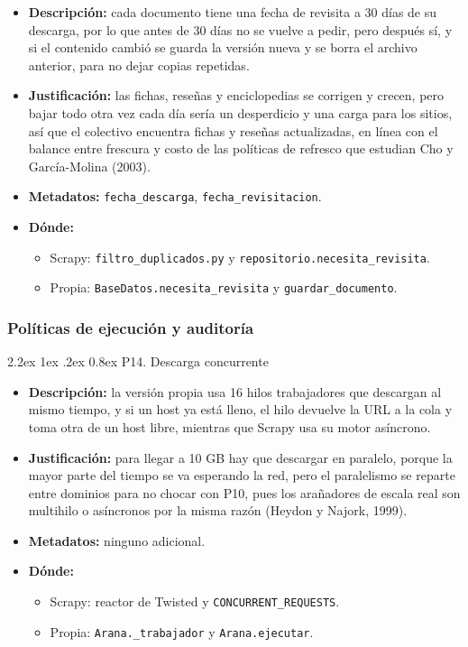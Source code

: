 \documentclass[11pt,spanish]{article}
\makeatletter
\renewcommand\paragraph{\@startsection{paragraph}{4}{\z@}%
  {2.2ex \@plus1ex \@minus.2ex}%
  {0.8ex}%
  {\normalfont\normalsize\bfseries}}
\makeatother
\begin{document}
\begin{itemize}[label=\textbullet, leftmargin=*]
    \item \textbf{Descripción:} cada documento tiene una fecha de revisita a 30 días de su descarga, por lo que antes de 30 días no se vuelve a pedir, pero después sí, y si el contenido cambió se guarda la versión nueva y se borra el archivo anterior, para no dejar copias repetidas.
    \item \textbf{Justificación:} las fichas, reseñas y enciclopedias se corrigen y crecen, pero bajar todo otra vez cada día sería un desperdicio y una carga para los sitios, así que el colectivo encuentra fichas y reseñas actualizadas, en línea con el balance entre frescura y costo de las políticas de refresco que estudian Cho y García-Molina (2003).
    \item \textbf{Metadatos:} \texttt{fecha\_descarga}, \texttt{fecha\_revisitacion}.
    \item \textbf{Dónde:}
    \begin{itemize}[label=--, leftmargin=*]
        \item Scrapy: \texttt{filtro\_duplicados.py} y \texttt{repositorio.necesita\_revisita}.
        \item Propia: \texttt{BaseDatos.necesita\_revisita} y \texttt{guardar\_documento}.
    \end{itemize}
\end{itemize}

\subsubsection{Políticas de ejecución y auditoría}

\paragraph{P14. Descarga concurrente}

\begin{itemize}[label=\textbullet, leftmargin=*]
    \item \textbf{Descripción:} la versión propia usa 16 hilos trabajadores que descargan al mismo tiempo, y si un host ya está lleno, el hilo devuelve la URL a la cola y toma otra de un host libre, mientras que Scrapy usa su motor asíncrono.
    \item \textbf{Justificación:} para llegar a 10 GB hay que descargar en paralelo, porque la mayor parte del tiempo se va esperando la red, pero el paralelismo se reparte entre dominios para no chocar con P10, pues los arañadores de escala real son multihilo o asíncronos por la misma razón (Heydon y Najork, 1999).
    \item \textbf{Metadatos:} ninguno adicional.
    \item \textbf{Dónde:}
    \begin{itemize}[label=--, leftmargin=*]
        \item Scrapy: reactor de Twisted y \texttt{CONCURRENT\_REQUESTS}.
        \item Propia: \texttt{Arana.\_trabajador} y \texttt{Arana.ejecutar}.
    \end{itemize}
\end{itemize}
\end{document}
